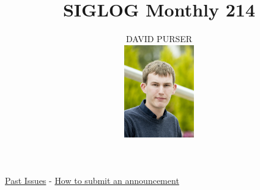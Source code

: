 \documentclass[prodmode,acmtecs]{acmsmall} %
\newcounter{colstart}
\begin{document}
\setcounter{colstart}{\thepage}

\title{\huge\sc SIGLOG Monthly 214}
\author{DAVID PURSER
\vspace*{-2.6cm}\begin{flushright}\includegraphics[width=30mm]{dp}\end{flushright}
}

\maketitlee

\href{https://lics.siglog.org/newsletters/}{Past Issues}
 - 
\href{https://lics.siglog.org/newsletters/inst.html}{How to submit an announcement}
\end{document}
